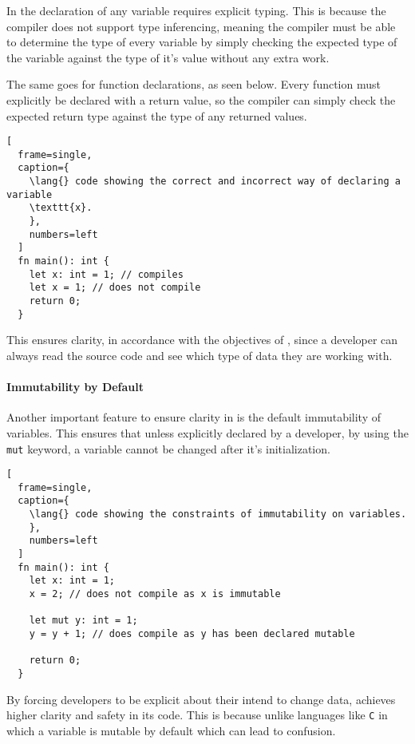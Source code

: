 In \lang{} the declaration of any variable requires explicit typing. This is because
the \lang{} compiler does not support type inferencing, meaning the compiler must be
able to determine the type of every variable by simply checking the expected type of
the variable against the type of it's value without any extra work.

The same goes for function declarations, as seen below. Every function must
explicitly be declared with a return value, so the compiler can simply check the
expected return type against the type of any returned values. 

\begin{lstlisting}[
  frame=single,
  caption={
    \lang{} code showing the correct and incorrect way of declaring a variable
    \texttt{x}.
    }, 
    numbers=left
  ]
  fn main(): int {
    let x: int = 1; // compiles
    let x = 1; // does not compile
    return 0;
  }
\end{lstlisting}

This ensures clarity, in accordance with the objectives of \lang{}, since a
developer can always read the source code and see which type of data they are working
with.

\paragraph{Immutability by Default} \hfill 
\vspace{0.1em}

Another important feature to ensure clarity in \lang{} is the default immutability of
variables. This ensures that unless explicitly declared by a developer, by using the
\texttt{mut} keyword, a variable
cannot be changed after it's initialization.

\begin{lstlisting}[
  frame=single,
  caption={
    \lang{} code showing the constraints of immutability on variables.
    }, 
    numbers=left
  ]
  fn main(): int {
    let x: int = 1; 
    x = 2; // does not compile as x is immutable

    let mut y: int = 1; 
    y = y + 1; // does compile as y has been declared mutable

    return 0;
  }
\end{lstlisting}

By forcing developers to be explicit about their intend to change data, \lang{}
achieves higher clarity and safety in its code. This is because unlike languages like
\texttt{C} in which a variable is mutable by default which can lead to confusion. 


